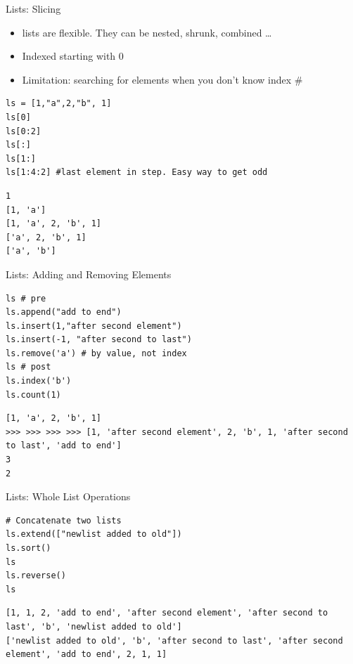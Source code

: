 \documentclass[presentation]{beamer}
\begin{document}
\begin{frame}[fragile,label=sec-4-1-6]{Lists: Slicing}
 \begin{itemize}
\item lists are flexible. They can be nested, shrunk, combined \ldots{}
\item Indexed starting with 0
\item Limitation: searching for elements when you don't know index \#
\end{itemize}

\lstset{numbers=left,language=Python,label= ,caption= }
\begin{lstlisting}
ls = [1,"a",2,"b", 1]
ls[0]
ls[0:2]
ls[:]
ls[1:]
ls[1:4:2] #last element in step. Easy way to get odd
\end{lstlisting}

\lstset{numbers=left,language=Python,label= ,caption= }
\begin{lstlisting}
1
[1, 'a']
[1, 'a', 2, 'b', 1]
['a', 2, 'b', 1]
['a', 'b']
\end{lstlisting}
\end{frame}


\begin{frame}[fragile,label=sec-4-1-7]{Lists: Adding and Removing Elements}
 \lstset{numbers=left,language=Python,label= ,caption= }
\begin{lstlisting}
ls # pre
ls.append("add to end")
ls.insert(1,"after second element")
ls.insert(-1, "after second to last")
ls.remove('a') # by value, not index
ls # post
ls.index('b')
ls.count(1)
\end{lstlisting}

\lstset{numbers=left,language=Python,label= ,caption= }
\begin{lstlisting}
[1, 'a', 2, 'b', 1]
>>> >>> >>> >>> [1, 'after second element', 2, 'b', 1, 'after second to last', 'add to end']
3
2
\end{lstlisting}
\end{frame}


\begin{frame}[fragile,label=sec-4-1-8]{Lists: Whole List Operations}
 \lstset{numbers=left,language=Python,label= ,caption= }
\begin{lstlisting}
# Concatenate two lists
ls.extend(["newlist added to old"])
ls.sort()
ls
ls.reverse()
ls
\end{lstlisting}

\lstset{numbers=left,language=Python,label= ,caption= }
\begin{lstlisting}
[1, 1, 2, 'add to end', 'after second element', 'after second to last', 'b', 'newlist added to old']
['newlist added to old', 'b', 'after second to last', 'after second element', 'add to end', 2, 1, 1]
\end{lstlisting}
\end{frame}
\end{document}
